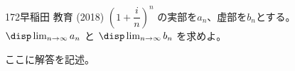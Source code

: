 \begin{prob}{172}{}{早稲田 教育 (2018)}
 $\left(1+\dfrac{i}{n}\right)^n$ の実部を$a_n$、虚部を$b_n$とする。$\disp \lim_{n\to\infty} a_n$ と $\disp \lim_{n\to\infty} b_n$ を求めよ。
\end{prob}
ここに解答を記述。